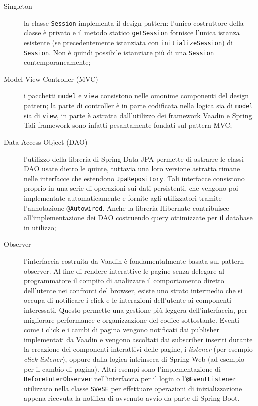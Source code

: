 \begin{description}
	\item[Singleton] la classe \verb!Session! implementa il design pattern: l'unico costruttore della classe è privato e il metodo statico \verb!getSession! fornisce l'unica istanza esistente (se precedentemente istanziata con \verb!initializeSession!) di \verb!Session!. Non è quindi possibile istanziare più di una \verb!Session! contemporaneamente;
	\item[Model-View-Controller (MVC)] i pacchetti \verb!model! e \verb!view! consistono nelle omonime componenti del design pattern; la parte di controller è in parte codificata nella logica sia di \verb!model! sia di \verb!view!, in parte è astratta dall'utilizzo dei framework Vaadin e Spring. Tali framework sono infatti pesantamente fondati sul pattern MVC;
	\item[Data Access Object (DAO)] l'utilizzo della libreria di Spring Data JPA permette di astrarre le classi DAO usate dietro le quinte, tuttavia una loro versione astratta rimane nelle interfacce che estendono \verb!JpaRepository!. Tali interfacce consistono proprio in una serie di operazioni sui dati persistenti, che vengono poi implementate automaticamente e fornite agli utilizzatori tramite l'annotazione \verb!@Autowired!. Anche la libreria Hibernate contribuisce all'implementazione dei DAO costruendo query ottimizzate per il database in utilizzo;
	\item[Observer] l'interfaccia costruita da Vaadin è fondamentalmente basata sul pattern observer. Al fine di rendere interattive le pagine senza delegare al programmatore il compito di analizzare il comportamento diretto dell'utente nei confronti del browser, esiste uno strato intermedio che si occupa di notificare i click e le interazioni dell'utente ai componenti interessati. Questo permette una gestione più leggera dell'interfaccia, per migliorare performance e organizzazione del codice sottostante. Eventi come i click e i cambi di pagina vengono notificati dai publisher implementati da Vaadin e vengono ascoltati dai subscriber inseriti durante la creazione dei componenti interattivi delle pagine, i \emph{listener} (per esempio \emph{click listener}), oppure dalla logica intrinseca di Spring Web (ad esempio per il cambio di pagina). Altri esempi sono l'implementazione di \verb!BeforeEnterObserver! nell'interfaccia per il login o l'\verb!@EventListener! utilizzato nella classe \verb!SVeSE! per effettuare operazioni di inizializzazione appena ricevuta la notifica di avvenuto avvio da parte di Spring Boot.

\end{description}

